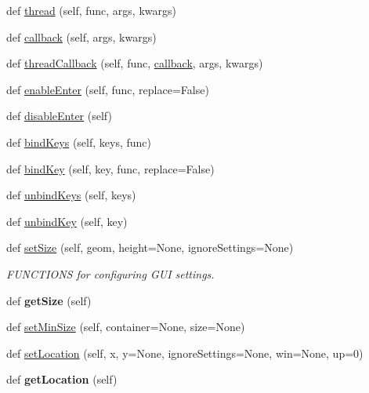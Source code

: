 \begin{DoxyCompactItemize}
def \hyperlink{classappjar_1_1gui_ad03085938c4f3620081998cbea2aaa5e}{thread} (self, func, args, kwargs)
\item 
def \hyperlink{classappjar_1_1gui_a2a2f2b7b9c196be3449f4490fe73ee8d}{callback} (self, args, kwargs)
\item 
def \hyperlink{classappjar_1_1gui_a5eea471867fa8c775a474c34181abad3}{thread\+Callback} (self, func, \hyperlink{classappjar_1_1gui_a2a2f2b7b9c196be3449f4490fe73ee8d}{callback}, args, kwargs)
\item 
def \hyperlink{classappjar_1_1gui_a06b1b40481bbc944960237fff978e071}{enable\+Enter} (self, func, replace=False)
\item 
def \hyperlink{classappjar_1_1gui_a656242f92aa0e2e5309d0d5937375ecc}{disable\+Enter} (self)
\item 
def \hyperlink{classappjar_1_1gui_a5e0af1dca75612aa8e928aaea3448f8b}{bind\+Keys} (self, keys, func)
\item 
def \hyperlink{classappjar_1_1gui_ae9748f0e34a0fc456803323db85d4b55}{bind\+Key} (self, key, func, replace=False)
\item 
def \hyperlink{classappjar_1_1gui_a9342b4f79427681dbc0471b087285ed4}{unbind\+Keys} (self, keys)
\item 
def \hyperlink{classappjar_1_1gui_a49468e5722bd7220d6a43cf647262367}{unbind\+Key} (self, key)
\item 
def \hyperlink{classappjar_1_1gui_a0b451e1a9bafe3beb0e655dd619ceefe}{set\+Size} (self, geom, height=None, ignore\+Settings=None)
\begin{DoxyCompactList}\small\item\em F\+U\+N\+C\+T\+I\+O\+NS for configuring G\+UI settings. \end{DoxyCompactList}\item 
\mbox{\label{classappjar_1_1gui_aade1bafdde616304c2227fff1d7ec4da}} 
def {\bfseries get\+Size} (self)
\item 
def \hyperlink{classappjar_1_1gui_a125479cea0bdfeb13d758629183c3bbc}{set\+Min\+Size} (self, container=None, size=None)
\item 
def \hyperlink{classappjar_1_1gui_ac8a8c2c4163d7ccb10d7749d6637046c}{set\+Location} (self, x, y=None, ignore\+Settings=None, win=None, up=0)
\item 
\mbox{\label{classappjar_1_1gui_ac5d46154a4567e34e2cc6cb797e7eeb3}} 
def {\bfseries get\+Location} (self)
\item 

\end{DoxyCompactItemize}
